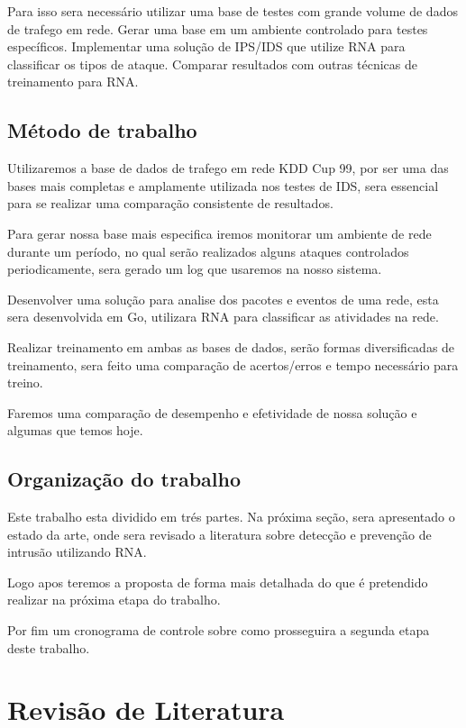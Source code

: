 \documentclass[
	12pt,				%
	openright,			%
	oneside,
	a4paper,			%
	english,			%
	french,				%
	spanish,			%
	brazil				%
	]{abntex2}
\begin{document}
Para isso sera necessário utilizar uma base de testes com grande volume de dados de trafego em rede.
Gerar uma base em um ambiente controlado para testes específicos.
Implementar uma solução de IPS/IDS que utilize RNA  para classificar os tipos de ataque.
Comparar resultados com outras técnicas de treinamento para RNA.


\section{Método de trabalho}

Utilizaremos a base de dados de trafego em rede KDD Cup 99, por ser uma das bases mais completas e amplamente utilizada nos testes de IDS, sera essencial para se realizar uma comparação consistente de resultados.

Para gerar nossa base mais especifica iremos monitorar um ambiente de rede durante um período, no qual serão realizados alguns ataques controlados periodicamente, sera gerado um log que usaremos na nosso sistema.

Desenvolver uma solução para analise dos pacotes e eventos de uma rede, esta sera desenvolvida em Go, utilizara RNA para classificar as atividades na rede.

Realizar treinamento em ambas as bases de dados, serão formas diversificadas de treinamento, sera feito uma comparação de acertos/erros e tempo necessário para treino.

Faremos uma comparação de desempenho e efetividade de nossa solução e algumas que temos hoje.

\section{Organização do trabalho}

Este trabalho esta dividido em trés partes.
Na próxima seção, sera apresentado o estado da arte, onde sera revisado a literatura sobre detecção e prevenção de intrusão utilizando RNA.

Logo apos teremos a proposta  de forma mais detalhada do que é pretendido realizar na próxima etapa do trabalho.

Por fim um cronograma de controle sobre como prosseguira a segunda etapa deste trabalho.


\chapter[Revisão de Literatura]{Revisão de Literatura}
\end{document}
